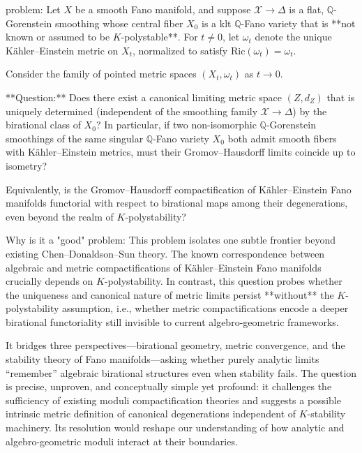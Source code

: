 problem:  
Let \( X \) be a smooth Fano manifold, and suppose \( \mathcal{X} \to \Delta \) is a flat, \(\mathbb{Q}\)-Gorenstein smoothing whose central fiber \(X_0\) is a klt \(\mathbb{Q}\)-Fano variety that is **not known or assumed to be \(K\)-polystable**. For \(t\neq 0\), let \(\omega_t\) denote the unique Kähler–Einstein metric on \(X_t\), normalized to satisfy \(\mathrm{Ric}(\omega_t)=\omega_t\).  

Consider the family of pointed metric spaces \((X_t, \omega_t)\) as \(t\to 0\).  

**Question:**  
Does there exist a canonical limiting metric space \((Z, d_Z)\) that is uniquely determined (independent of the smoothing family \(\mathcal{X}\to \Delta\)) by the birational class of \(X_0\)? In particular, if two non-isomorphic \(\mathbb{Q}\)-Gorenstein smoothings of the same singular \(\mathbb{Q}\)-Fano variety \(X_0\) both admit smooth fibers with Kähler–Einstein metrics, must their Gromov–Hausdorff limits coincide up to isometry?  

Equivalently, is the Gromov–Hausdorff compactification of Kähler–Einstein Fano manifolds functorial with respect to birational maps among their degenerations, even beyond the realm of \(K\)-polystability?  

Why is it a "good" problem:  
This problem isolates one subtle frontier beyond existing Chen–Donaldson–Sun theory. The known correspondence between algebraic and metric compactifications of Kähler–Einstein Fano manifolds crucially depends on \(K\)-polystability. In contrast, this question probes whether the uniqueness and canonical nature of metric limits persist **without** the \(K\)-polystability assumption, i.e., whether metric compactifications encode a deeper birational functoriality still invisible to current algebro-geometric frameworks.  

It bridges three perspectives—birational geometry, metric convergence, and the stability theory of Fano manifolds—asking whether purely analytic limits “remember” algebraic birational structures even when stability fails. The question is precise, unproven, and conceptually simple yet profound: it challenges the sufficiency of existing moduli compactification theories and suggests a possible intrinsic metric definition of canonical degenerations independent of \(K\)-stability machinery. Its resolution would reshape our understanding of how analytic and algebro-geometric moduli interact at their boundaries.